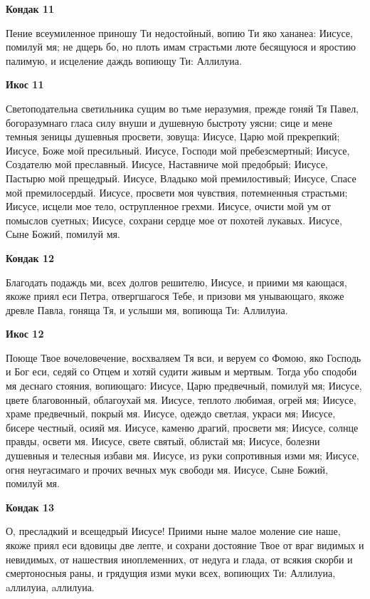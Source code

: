 \medskip
\bfseries Кондак 11\normalfont{}\nopagebreak


Пение
всеумиленное приношу Ти недостойный, вопию Ти яко хананеа: Иисусе, помилуй мя; не дщерь бо, но плоть имам страстьми люте бесящуюся и яростию палимую, и исцеление даждь вопиющу Ти: Аллилуиа.


\medskip
\bfseries Икос 11\normalfont{}\nopagebreak


Светоподательна
светильника сущим во тьме неразумия, прежде гоняй Тя Павел, богоразумнаго гласа силу внуши и душевную быстроту уясни; сице и мене темныя зеницы душевныя просвети, зовуща: Иисусе, Царю мой прекрепкий; Иисусе, Боже мой пресильный. Иисусе, Господи мой пребезсмертный; Иисусе, Создателю мой преславный. Иисусе, Наставниче мой предобрый; Иисусе, Пастырю мой прещедрый. Иисусе, Владыко мой премилостивый; Иисусе, Спасе мой премилосердый. Иисусе, просвети моя чувствия, потемненныя страстьми; Иисусе, исцели мое тело, острупленное грехми. Иисусе, очисти мой ум от помыслов суетных; Иисусе, сохрани сердце мое от похотей лукавых. Иисусе, Сыне Божий, помилуй мя.


\medskip
\bfseries Кондак 12\normalfont{}\nopagebreak


Благодать
подаждь ми, всех долгов решителю, Иисусе, и приими мя кающася, якоже приял еси Петра, отвергшагося Тебе, и призови мя унывающаго, якоже древле Павла, гоняща Тя, и услыши мя, вопиюща Ти: Аллилуиа.


\medskip
\bfseries Икос 12\normalfont{}\nopagebreak


Поюще
Твое вочеловечение, восхваляем Тя вси, и веруем со Фомою, яко Господь и Бог еси, седяй со Отцем и хотяй судити живым и мертвым. Тогда убо сподоби мя деснаго стояния, вопиющаго: Иисусе, Царю предвечный, помилуй мя; Иисусе, цвете благовонный, облагоухай мя. Иисусе, теплото любимая, огрей мя; Иисусе, храме предвечный, покрый мя. Иисусе, одеждо светлая, украси мя; Иисусе, бисере честный, осияй мя. Иисусе, каменю драгий, просвети мя; Иисусе, солнце правды, освети мя. Иисусе, свете святый, облистай мя; Иисусе, болезни душевныя и телесныя избави мя. Иисусе, из руки сопротивныя изми мя; Иисусе, огня неугасимаго и прочих вечных мук свободи мя. Иисусе, Сыне Божий, помилуй мя. 


\medskip
\bfseries Кондак 13\normalfont{}\nopagebreak


О,
пресладкий и всещедрый Иисусе! Приими ныне малое моление сие наше, якоже приял еси вдовицы две лепте, и сохрани достояние Твое от враг видимых и невидимых, от нашествия иноплеменних, от недуга и глада, от всякия скорби и смертоносныя раны, и грядущия изми муки всех, вопиющих Ти: Аллилуиа, aллилуиа, aллилуиа.


